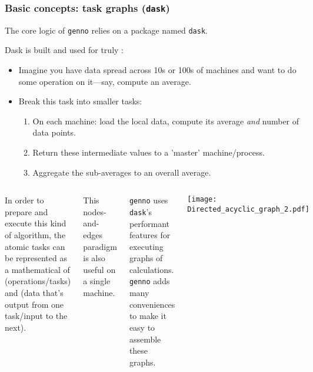\documentclass[12pt,aspectratio=169]{beamer}
\renewcommand{\mod}[1]{\texttt{#1}}
\begin{document}
\begin{frame}[allowframebreaks]
\frametitle{Basic concepts: task graphs (\texttt{dask})}
The core logic of \mod{genno} relies on a package named \mod{dask}.

\medskip
Dask is built and used for truly :
\begin{itemize}
  \item Imagine you have data spread across 10s or 100s of machines
    and want to do some operation on it—say, compute an average.
  \item Break this task into smaller tasks:
    \begin{enumerate}
      \item On each machine: load the local data,
        compute its average \emph{and} number of data points.
      \item Return these intermediate values to a 'master' machine/process.
      \item Aggregate the sub-averages to an overall average.
    \end{enumerate}
\end{itemize}

\framebreak

\begin{columns}
\column{0.45\paperwidth}
In order to prepare and execute this kind of algorithm,
the atomic tasks can be represented as a mathematical 
of  (operations/tasks)
and  (data that's output from one task/input to the next).

\medskip
This nodes-and-edges paradigm is also useful on a single machine.

\medskip
\mod{genno} uses \mod{dask}'s performant features for executing graphs of calculations.
\mod{genno} adds many conveniences to make it easy to assemble these graphs.

\column{0.45\paperwidth}
\texttt{[image: Directed\_acyclic\_graph\_2.pdf]}
\end{columns}
\end{frame}
\end{document}
